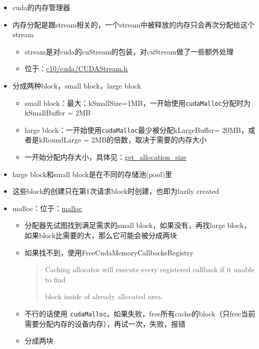 \begin{itemize}
\item
  cuda的内存管理器
\item
  内存分配是跟stream相关的，一个stream中被释放的内存只会再次分配给这个stream

  \begin{itemize}
  \tightlist
  \item
    stream是对cuda的cuStream的包装，对cuStream做了一些额外处理
  \item
    位于：\href{https://github.com/pytorch/pytorch/blob/master/c10/cuda/CUDAStream.h}{c10/cuda/CUDAStream.h}
  \end{itemize}
\item
  分成两种block，small block，large block

  \begin{itemize}
  \tightlist
  \item
    small
    block：最大：kSmallSize=1MB，一开始使用\texttt{cudaMalloc}分配时为kSmallBuffer
    = 2MB
  \item
    large block：一开始使用\texttt{cudaMalloc}最少被分配kLargeBuffer=
    20MB，或者是kRoundLarge = 2MB的倍数，取决于需要的内存大小
  \item
    一开始分配内存大小，具体见：\href{https://github.com/pytorch/pytorch/blob/master/c10/cuda/CUDACachingAllocator.cpp\#L454}{get\_allocation\_size}
  \end{itemize}
\item
  large block和small block是在不同的存储池(pool)里
\item
  这些block的创建只在第1次请求block时创建，也即为lazily created
\item
  malloc：位于：\href{https://github.com/pytorch/pytorch/blob/master/c10/cuda/CUDACachingAllocator.cpp\#L192}{malloc}

  \begin{itemize}
  \item
    分配器先试图找到满足需求的small block，如果没有，再找large
    block，如果block比需要的大，那么它可能会被分成两块
  \item
    如果找不到，使用FreeCudaMemoryCallbacksRegistry

    \begin{quote}
    Caching allocator will execute every registered callback if it
    unable to find

    block inside of already allocated area.
    \end{quote}
  \item
    不行的话使用
    \texttt{cudaMalloc}，如果失败，free所有cache的block（只free当前需要分配内存的设备内存），再试一次，失败，报错
  \item
    分成两块


\end{itemize}
\end{itemize}
